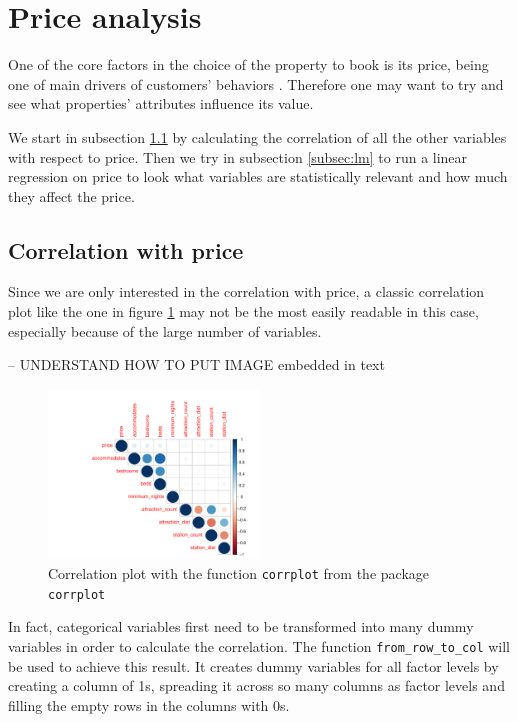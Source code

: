 \section{Price analysis}\label{Sec:Price analysis}

One of the core factors in the choice of the property to book is its price, being one of main drivers of customers' behaviors \citep{liang2018understanding}. Therefore one may want to try and see what properties' attributes influence its value.

We start in subsection \ref{subsec:corr} by calculating the correlation of all the other variables with respect to price. Then we try in subsection \ref{subsec:lm} to run a linear regression on price to look what variables are statistically relevant and how much they affect the price.


\subsection{Correlation with price}\label{subsec:corr}

Since we are only interested in the correlation with price, a classic correlation plot like the one in figure \ref{figure:corrplot} may not be the most easily readable in this case, especially because of the large number of variables.

-- UNDERSTAND HOW TO PUT IMAGE embedded in text

\begin{figure}[H]
\begin{center}
\includegraphics[width=0.5\textwidth]{corrplot.pdf}
\caption{Correlation plot with the function  \texttt{corrplot} from the package \texttt{corrplot} }
\label{figure:corrplot}
\end{center}
\end{figure}

In fact, categorical variables first need to be transformed into many dummy variables in order to calculate the correlation. The function \texttt{from\_row\_to\_col} will be used to achieve this result. It creates dummy variables for all factor levels by creating a column of 1s, spreading it across so many columns as factor levels and filling the empty rows in the columns with 0s.


